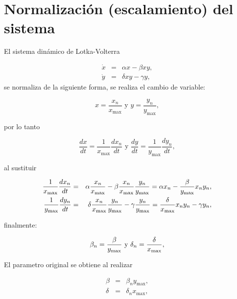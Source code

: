 \documentclass[letterpaper,11pt]{article}
\begin{document}
\bigskip 

\section{Normalizaci\'{o}n (escalamiento) del sistema}

El sistema din\'{a}mico de Lotka-Volterra

\begin{eqnarray*}
\dot{x} &=&\alpha x-\beta xy, \\
\dot{y} &=&\delta xy-\gamma y,
\end{eqnarray*}%
\newline
se normaliza de la siguiente forma, se realiza el cambio de variable:\newline

\begin{equation*}
x=\frac{x_{n}}{x_{\max }}\text{ y }y=\frac{y_{n}}{y_{\max }},
\end{equation*}

por lo tanto

\begin{equation*}
\frac{dx}{dt}=\frac{1}{x_{\max }}\frac{dx_{n}}{dt}\text{ y }\frac{dy}{dt}=%
\frac{1}{y_{\max }}\frac{dy_{n}}{dt},
\end{equation*}

al sustituir

\begin{eqnarray*}
\frac{1}{x_{\max }}\frac{dx_{n}}{dt} &=&\alpha \frac{x_{n}}{x_{\max }}-\beta 
\frac{x_{n}}{x_{\max }}\frac{y_{n}}{y_{\max }}=\alpha x_{n}-\frac{\beta }{%
y_{\max }}x_{n}y_{n}, \\
\frac{1}{y_{\max }}\frac{dy_{n}}{dt} &=&\delta \frac{x_{n}}{x_{\max }}\frac{%
y_{n}}{y_{\max }}-\gamma \frac{y_{n}}{y_{\max }}=\frac{\delta }{x_{\max }}%
x_{n}y_{n}-\gamma y_{n},
\end{eqnarray*}

finalmente:

\begin{equation*}
\beta _{n}=\frac{\beta }{y_{\max }}\text{ y }\delta _{n}=\frac{\delta }{%
x_{\max }},
\end{equation*}

El parametro original se obtiene al realizar

\begin{eqnarray*}
\beta  &=&\beta _{n}y_{\max }, \\
\delta  &=&\delta _{n}x_{\max },
\end{eqnarray*}
\end{document}
